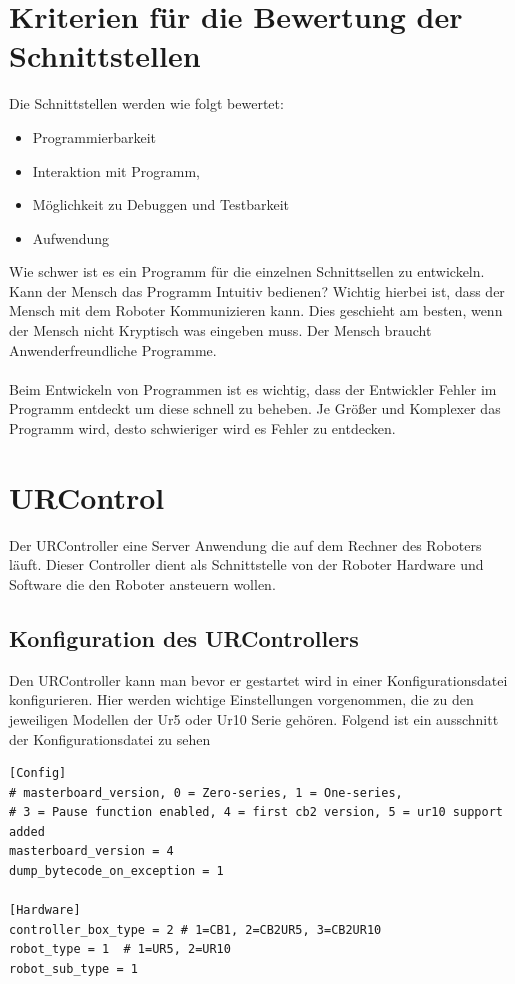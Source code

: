 \section{Kriterien für die Bewertung der Schnittstellen}
\label{sec:criterias_of_solutions_kon}

Die Schnittstellen werden wie folgt bewertet:

\begin{itemize}
\item Programmierbarkeit
\item Interaktion mit Programm,
\item Möglichkeit zu Debuggen und Testbarkeit
\item Aufwendung
\end{itemize}

Wie schwer ist es ein Programm für die einzelnen Schnittsellen zu entwickeln.
Kann der Mensch das Programm Intuitiv bedienen? Wichtig hierbei ist, dass der Mensch mit dem Roboter Kommunizieren kann. Dies geschieht am besten, wenn der Mensch nicht Kryptisch was eingeben muss. Der Mensch braucht Anwenderfreundliche Programme.
\\\\
Beim Entwickeln von Programmen ist es wichtig, dass der Entwickler Fehler im Programm entdeckt um diese schnell zu beheben.
Je Größer und Komplexer das Programm wird, desto schwieriger wird es Fehler zu entdecken.


\section{URControl}
\label{sec:ur_control_gru}

Der URController eine Server Anwendung die auf dem Rechner des Roboters läuft. 
Dieser Controller dient als Schnittstelle von der Roboter Hardware und Software die den Roboter ansteuern wollen.

\subsection{Konfiguration des URControllers}
\label{urcontrol_rci_gru}

Den URController kann man bevor er gestartet wird in einer Konfigurationsdatei konfigurieren.
Hier werden wichtige Einstellungen vorgenommen, die zu den jeweiligen Modellen der Ur5 oder Ur10 Serie gehören. Folgend ist ein ausschnitt der Konfigurationsdatei zu sehen
\\
\begin{lstlisting}
[Config]
# masterboard_version, 0 = Zero-series, 1 = One-series, 
# 3 = Pause function enabled, 4 = first cb2 version, 5 = ur10 support added
masterboard_version = 4
dump_bytecode_on_exception = 1

[Hardware]
controller_box_type = 2 # 1=CB1, 2=CB2UR5, 3=CB2UR10
robot_type = 1  # 1=UR5, 2=UR10
robot_sub_type = 1
\end{lstlisting}

